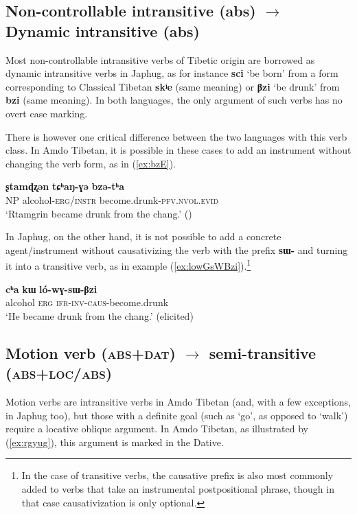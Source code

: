 \documentclass[oneside,a4paper,11pt]{article}
\newcommand{\ipa}[1]{{\phon\textbf{\mbox{#1}}}} %
\newcommand{\refb}[1]{(\ref{#1})}
\begin{document}
\subsection{Non-controllable intransitive (abs) $\rightarrow$ Dynamic intransitive (abs)}  
Most non-controllable intransitive verbs of Tibetic origin are borrowed as dynamic intransitive verbs in Japhug, as for instance \ipa{sci} `be born' from a form corresponding to Classical Tibetan \ipa{skʲe} (same meaning) or \ipa{βzi} `be drunk' from \ipa{bzi} (same meaning). In both languages, the only argument of such verbs has no overt case marking.

There is however one critical difference between the two languages with this verb class. In Amdo Tibetan, it is possible in these cases to add an instrument without changing the verb form, as in \refb{ex:bzE}.

\begin{exe}
\ex \label{ex:bzE}
\gll
\ipa{ʂtamɖʐən} 	\ipa{tɕʰaŋ-ɣə} \ipa{bzə-tʰa} 	 \\
NP alcohol-\textsc{erg/instr} become.drunk-\textsc{pfv.nvol.evid} \\
\glt `Rtamgrin became drunk from the chang.' (\citealt[112, ex. 443]{haller04themchen})
\end{exe}

In Japhug, on the other hand, it is not possible to add a concrete agent/instrument without causativizing the verb with the prefix \ipa{sɯ-} and turning it into a transitive verb, as in example \refb{ex:lowGsWBzi}.\footnote{In the case of transitive verbs, the causative prefix is also most commonly added to verbs that take an instrumental postpositional phrase, though in that case causativization is only optional.}

\begin{exe}
\ex \label{ex:lowGsWBzi}
\gll
\ipa{cʰa} 	\ipa{kɯ} 	\ipa{ló-wɣ-sɯ-βzi} \\ 
alcohol \textsc{erg} \textsc{ifr-inv-caus}-become.drunk \\
\glt `He became drunk from the chang.' (elicited)
\end{exe}


\subsection{Motion verb (\textsc{abs+dat}) $\rightarrow$ semi-transitive (\textsc{abs+loc/abs})}  
Motion verbs are intransitive verbs in Amdo Tibetan (and, with a few exceptions, in Japhug too), but those with a definite goal (such as `go', as opposed to `walk') require a locative oblique argument. In Amdo Tibetan, as illustrated by \refb{ex:rgyug}, this argument is marked in the Dative.
\end{document}
